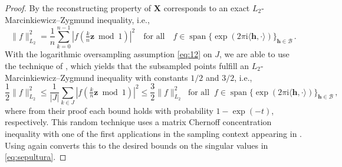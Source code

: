 \documentclass[a4paper]{amsart}
\DeclareMathOperator{\Span}{span}
\newcommand{\modone}{\bmod{}1}
\begin{document}
\begin{proof} By \cite[Lemma~2.2]{BKPU22} the reconstructing property of $\bm X$ corresponds to an exact $L_2$-Marcinkiewicz--Zygmund inequality, i.e.,
    \begin{equation*}
        \|f\|_{L_2}^{2}
        = \frac 1n \sum_{k=0}^{n-1} |f(\tfrac kn \bm z\modone)|^2
        \quad\text{for all}\quad
        f\in\Span\{\exp(2\pi\mathrm i\langle\bm h,\cdot\rangle)\}_{\bm h\in\mathcal B} \,.
    \end{equation*}
    With the logarithmic oversampling assumption \eqref{eq:12} on $J$, we are able to use the technique of \cite[Theorem~3.1]{BKPU22}, which yields that the subsampled points fulfill an $L_2$-Marcinkiewicz--Zygmund inequality with constants $1/2$ and $3/2$, i.e.,
    \begin{equation*}
        \frac{1}{2} \|f\|_{L_2}^{2}
        \le \frac{1}{|J|} \sum_{k\in J} |f(\tfrac kn \bm z\modone)|^2
        \le \frac{3}{2} \|f\|_{L_2}^{2}
        \;\;\text{for all}\;\;
        f\in\Span\{\exp(2\pi\mathrm i\langle\bm h,\cdot\rangle)\}_{\bm h\in\mathcal B} \,,
    \end{equation*}
    where from their proof each bound holds with probability $1-\exp(-t)$, respectively.
    This random technique uses a matrix Chernoff concentration inequality \cite[Theorem~1.1]{Tropp11} with one of the first applications in the sampling context appearing in \cite[Theorem~2.1]{CM17}.
    Using \cite[Lemma~2.2]{BKPU22} again converts this to the desired bounds on the singular values in \eqref{eq:sepultura}.


\end{proof}
\end{document}
